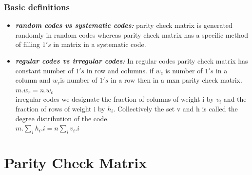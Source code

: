 \documentclass[xcolor=dvipsname]
{beamer}
\begin{document}

\appendix	
\begin{frame}[t] 
\frametitle{Basic definitions}

\begin{itemize}
\item \emph {\textbf{random codes vs systematic codes:}} parity check matrix is generated randomly in random codes whereas parity check matrix has a specific method of filling $1's$ in matrix in a systematic code.
\item \emph{\textbf{regular codes vs irregular codes:}} In regular codes parity check matrix has constant number of $1's$ in row and columns. if $w_c$ is number of $1's$ in a column and $w_r $is number of $1's$ in a row then in a mxn parity check matrix. \\
\alert{$ m.w_r =n.w_c $} \\
 irregular codes 
we designate the fraction of columns
of weight i by $v_i$ and the fraction of rows of weight i by $h_i$. Collectively the set
v and h is called the degree distribution of the code. \\
\alert{$ m. \sum_{i} h_i.i = n \sum_{i} v_i.i $}

\end{itemize}         
\end{frame}

\section{Parity Check Matrix}
\end{document}
